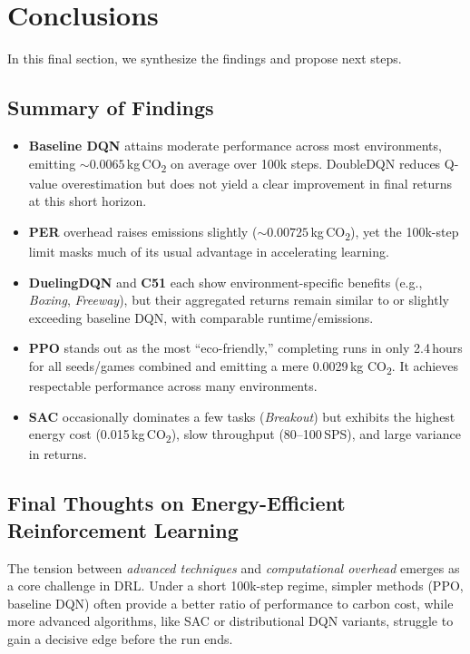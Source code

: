 \section{Conclusions}
\label{sec:conclusions}
In this final section, we synthesize the findings and propose next steps.

\subsection{Summary of Findings}
\label{subsec:summary_of_findings}

\begin{itemize}
	\item \textbf{Baseline DQN} attains moderate performance across most environments, 
	emitting $\sim0.0065$\,kg\,CO\textsubscript{2} on average over 100k steps. 
	DoubleDQN reduces Q-value overestimation but does not yield a clear improvement 
	in final returns at this short horizon.
	\item \textbf{PER} overhead raises emissions slightly 
	($\sim0.00725$\,kg\,CO\textsubscript{2}), 
	yet the 100k-step limit masks much of its usual advantage in accelerating learning.
	\item \textbf{DuelingDQN} and \textbf{C51} each show environment-specific benefits 
	(e.g., \emph{Boxing}, \emph{Freeway}), but their aggregated returns 
	remain similar to or slightly exceeding baseline DQN, 
	with comparable runtime/emissions.
	\item \textbf{PPO} stands out as the most “eco-friendly,” completing runs in only 
	2.4\,hours for all seeds/games combined and emitting a mere 0.0029\,kg CO\textsubscript{2}. 
	It achieves respectable performance across many environments.
	\item \textbf{SAC} occasionally dominates a few tasks (\emph{Breakout}) but 
	exhibits the highest energy cost (0.015\,kg\,CO\textsubscript{2}), 
	slow throughput (80--100\,SPS), and large variance in returns.
\end{itemize}

\subsection{Final Thoughts on Energy-Efficient Reinforcement Learning}
\label{subsec:final_thoughts_energy_eff}

The tension between \emph{advanced techniques} and \emph{computational overhead} emerges 
as a core challenge in DRL. Under a short 100k-step regime, simpler methods (PPO, 
baseline DQN) often provide a better ratio of performance to carbon cost, while 
more advanced algorithms, like SAC or distributional DQN variants, struggle to gain a decisive edge 
before the run ends.

